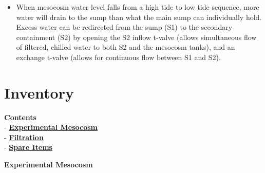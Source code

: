 \documentclass[]{book}
\providecommand{\tightlist}{%
  \setlength{\itemsep}{0pt}\setlength{\parskip}{0pt}}
\begin{document}
\begin{itemize}
  \begin{itemize}
  \tightlist
  \item
    When mesocosm water level falls from a high tide to low tide
    sequence, more water will drain to the sump than what the main sump
    can individually hold. Excess water can be redirected from the sump
    (S1) to the secondary containment (S2) by opening the S2 inflow
    t-valve (allows simultaneous flow of filtered, chilled water to both
    S2 and the mesocosm tanks), and an exchange t-valve (allows for
    continuous flow between S1 and S2).
  \end{itemize}
\end{itemize}

\chapter{Inventory}\label{inventory}

\textbf{Contents}\\
- \protect\hyperlink{Experimental_Mesocosm}{\textbf{Experimental
Mesocosm}}\\
- \protect\hyperlink{Filtration}{\textbf{Filtration}}\\
- \protect\hyperlink{Spare_Items}{\textbf{Spare Items}}

 \textbf{Experimental Mesocosm}
\end{document}
